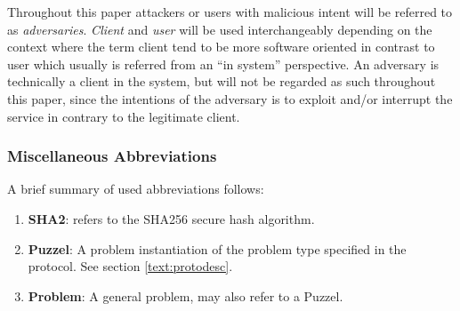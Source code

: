 Throughout this paper attackers or users with malicious intent will be referred to as \emph{adversaries}.
\emph{Client} and \emph{user} will be used interchangeably depending on the context where the term client tend to be more software oriented in contrast to user which usually is referred from an ``in system'' perspective.
An adversary is technically a client in the system, but will not be regarded as such throughout this paper, since the intentions of the adversary is to exploit and/or interrupt the service in contrary to the legitimate client. 

\subsubsection{Miscellaneous Abbreviations}
A brief summary of used abbreviations follows:
\begin{enumerate}
\item {\textbf{ SHA2}}: refers to the SHA256 secure hash algorithm\cite{sha2}.
\item \textbf{ Puzzel}: A problem instantiation of the problem type specified in the protocol. See section \ref{text:protodesc}.
\item \textbf{ Problem}: A general problem, may also refer to a Puzzel.
\end{enumerate}